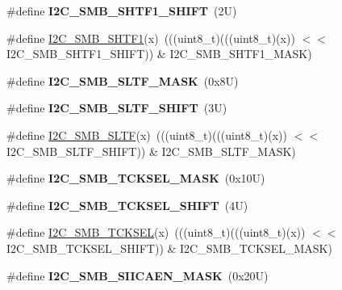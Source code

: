 \begin{DoxyCompactItemize}
\#define {\bfseries I2\+C\+\_\+\+S\+M\+B\+\_\+\+S\+H\+T\+F1\+\_\+\+S\+H\+I\+FT}~(2\+U)
\item 
\#define \mbox{\hyperlink{group___i2_c___register___masks_ga1f9be41fbf54c218799bc986a2be0d3f}{I2\+C\+\_\+\+S\+M\+B\+\_\+\+S\+H\+T\+F1}}(x)~(((uint8\+\_\+t)(((uint8\+\_\+t)(x)) $<$$<$ I2\+C\+\_\+\+S\+M\+B\+\_\+\+S\+H\+T\+F1\+\_\+\+S\+H\+I\+FT)) \& I2\+C\+\_\+\+S\+M\+B\+\_\+\+S\+H\+T\+F1\+\_\+\+M\+A\+SK)
\item 
\mbox{\label{group___i2_c___register___masks_ga19239e39699b975c050e78098f1160be}} 
\#define {\bfseries I2\+C\+\_\+\+S\+M\+B\+\_\+\+S\+L\+T\+F\+\_\+\+M\+A\+SK}~(0x8\+U)
\item 
\mbox{\label{group___i2_c___register___masks_ga158639264e921e0cdc2d1c531c0481be}} 
\#define {\bfseries I2\+C\+\_\+\+S\+M\+B\+\_\+\+S\+L\+T\+F\+\_\+\+S\+H\+I\+FT}~(3\+U)
\item 
\#define \mbox{\hyperlink{group___i2_c___register___masks_gacdc4b251c48d9987a5183ac3b0e6b0c1}{I2\+C\+\_\+\+S\+M\+B\+\_\+\+S\+L\+TF}}(x)~(((uint8\+\_\+t)(((uint8\+\_\+t)(x)) $<$$<$ I2\+C\+\_\+\+S\+M\+B\+\_\+\+S\+L\+T\+F\+\_\+\+S\+H\+I\+FT)) \& I2\+C\+\_\+\+S\+M\+B\+\_\+\+S\+L\+T\+F\+\_\+\+M\+A\+SK)
\item 
\mbox{\label{group___i2_c___register___masks_ga7a0dba773688ec97b8f2a6306085c136}} 
\#define {\bfseries I2\+C\+\_\+\+S\+M\+B\+\_\+\+T\+C\+K\+S\+E\+L\+\_\+\+M\+A\+SK}~(0x10\+U)
\item 
\mbox{\label{group___i2_c___register___masks_ga07c36bbad07617ae5ae27911d3b00290}} 
\#define {\bfseries I2\+C\+\_\+\+S\+M\+B\+\_\+\+T\+C\+K\+S\+E\+L\+\_\+\+S\+H\+I\+FT}~(4\+U)
\item 
\#define \mbox{\hyperlink{group___i2_c___register___masks_gaf627ce545902545010418f2bb533794c}{I2\+C\+\_\+\+S\+M\+B\+\_\+\+T\+C\+K\+S\+EL}}(x)~(((uint8\+\_\+t)(((uint8\+\_\+t)(x)) $<$$<$ I2\+C\+\_\+\+S\+M\+B\+\_\+\+T\+C\+K\+S\+E\+L\+\_\+\+S\+H\+I\+FT)) \& I2\+C\+\_\+\+S\+M\+B\+\_\+\+T\+C\+K\+S\+E\+L\+\_\+\+M\+A\+SK)
\item 
\mbox{\label{group___i2_c___register___masks_gae54c99ffbc7df399f532cf0ddea2b43a}} 
\#define {\bfseries I2\+C\+\_\+\+S\+M\+B\+\_\+\+S\+I\+I\+C\+A\+E\+N\+\_\+\+M\+A\+SK}~(0x20\+U)
$$
\end{DoxyCompactItemize}

